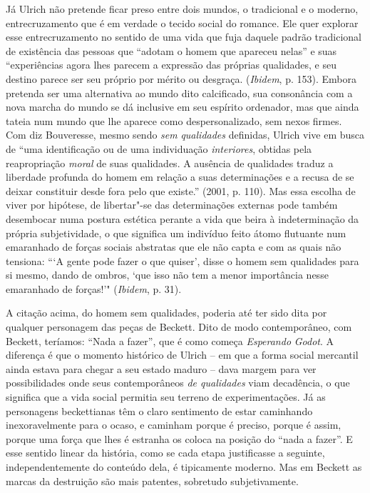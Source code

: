 Já Ulrich não pretende ficar preso entre dois mundos, o tradicional e o
moderno, entrecruzamento que é em verdade o tecido social do romance.
Ele quer explorar esse entrecruzamento no sentido de uma vida que fuja
daquele padrão tradicional de existência das pessoas que ``adotam o
homem que apareceu nelas'' e suas ``experiências agora lhes parecem a
expressão das próprias qualidades, e seu destino parece ser seu próprio
por mérito ou desgraça. (\emph{Ibidem}, p. 153). Embora pretenda ser uma
alternativa ao mundo dito calcificado, sua consonância com a nova marcha
do mundo se dá inclusive em seu espírito ordenador, mas que ainda tateia
num mundo que lhe aparece como despersonalizado, sem nexos firmes. Com
diz Bouveresse, mesmo sendo \emph{sem} \emph{qualidades} definidas,
Ulrich vive em busca de ``uma identificação ou de uma individuação
\emph{interiores}, obtidas pela reapropriação \emph{moral} de suas
qualidades. A ausência de qualidades traduz a liberdade profunda do
homem em relação a suas determinações e a recusa de se deixar constituir
desde fora pelo que existe.'' (2001, p. 110). Mas essa escolha de viver
por hipótese, de libertar"-se das determinações externas pode também
desembocar numa postura estética perante a vida que beira à
indeterminação da própria subjetividade, o que significa um indivíduo
feito átomo flutuante num emaranhado de forças sociais abstratas que ele
não capta e com as quais não tensiona: ```A gente pode fazer o que
quiser', disse o homem sem qualidades para si mesmo, dando de ombros,
`que isso não tem a menor importância nesse emaranhado de forças!'"
(\emph{Ibidem}, p. 31).

A citação acima, do homem sem qualidades, poderia até ter sido dita por
qualquer personagem das peças de Beckett. Dito de modo contemporâneo,
com Beckett, teríamos: ``Nada a fazer'', que é como começa
\emph{Esperando} \emph{Godot}. A diferença é que o momento histórico de
Ulrich -- em que a forma social mercantil ainda estava para chegar a
seu estado maduro -- dava margem para ver possibilidades onde seus
contemporâneos \emph{de qualidades} viam decadência, o que significa que
a vida social permitia seu terreno de experimentações. Já as personagens
beckettianas têm o claro sentimento de estar caminhando inexoravelmente
para o ocaso, e caminham porque é preciso, porque é assim, porque uma
força que lhes é estranha os coloca na posição do ``nada a fazer''. E
esse sentido linear da história, como se cada etapa justificasse a
seguinte, independentemente do conteúdo dela, é tipicamente moderno. Mas
em Beckett as marcas da destruição são mais patentes, sobretudo
subjetivamente.


